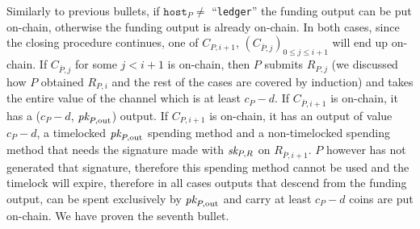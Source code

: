   Similarly to previous bullets, if $\mathtt{host}_P \neq$ ``\texttt{ledger}'' the funding
  output can be put on-chain, otherwise the funding output is already on-chain.
  In both cases, since the closing procedure continues, one of $C_{P, i+1}$,
  $(C_{\bar{P}, j})_{0 \leq j \leq i+1}$ will end up on-chain. If $C_{\bar{P},
  j}$ for some $j < i+1$ is on-chain, then $P$ submits $R_{P, j}$ (we discussed
  how $P$ obtained $R_{P, i}$ and the rest of the cases are covered by
  induction) and takes the entire value of the channel which is at least $c_P -
  d$. If $C_{\bar{P}, i+1}$ is on-chain, it has a ($c_P - d$, $\textit{pk}_{P,
  \mathrm{out}}$) output. If $C_{P, i+1}$ is on-chain, it has an output of value
  $c_P - d$, a timelocked $\textit{pk}_{P, \mathrm{out}}$ spending method and a
  non-timelocked spending method that needs the signature made with $\textit{sk}_{P, R}$
  on $R_{\bar{P}, i+1}$. $P$ however has not generated that signature, therefore
  this spending method cannot be used and the timelock will expire, therefore in
  all cases outputs that descend from the funding output, can be spent
  exclusively by $\textit{pk}_{P, \mathrm{out}}$ and carry at least $c_P - d$ coins are
  put on-chain. We have proven the seventh bullet.

